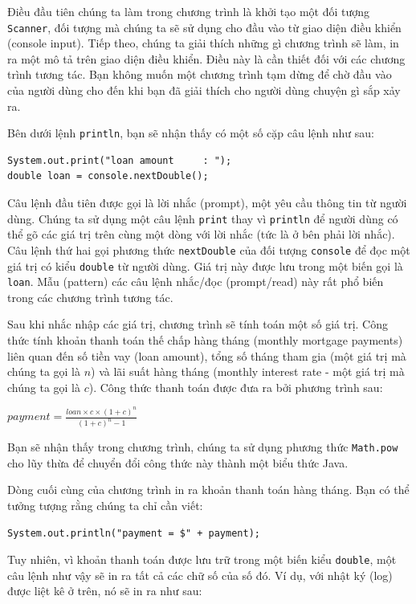 Điều đầu tiên chúng ta làm trong chương trình là khởi tạo một đối tượng
\texttt{Scanner}, đối tượng mà chúng ta sẽ sử dụng cho đầu vào từ giao
diện điều khiển (console input). Tiếp theo, chúng ta giải thích những gì
chương trình sẽ làm, in ra một mô tả trên giao diện điều khiển. Điều này
là cần thiết đối với các chương trình tương tác. Bạn không muốn một
chương trình tạm dừng để chờ đầu vào của người dùng cho đến khi bạn đã
giải thích cho người dùng chuyện gì sắp xảy ra.

Bên dưới lệnh \texttt{println}, bạn sẽ nhận thấy có một số cặp câu lệnh
như sau:

\begin{verbatim}
System.out.print("loan amount     : ");
double loan = console.nextDouble();
\end{verbatim}

Câu lệnh đầu tiên được gọi là lời nhắc (prompt), một yêu cầu thông tin
từ người dùng. Chúng ta sử dụng một câu lệnh \texttt{print} thay vì
\texttt{println} để người dùng có thể gõ các giá trị trên cùng một dòng
với lời nhắc (tức là ở bên phải lời nhắc). Câu lệnh thứ hai gọi phương
thức \texttt{nextDouble} của đối tượng \texttt{console} để đọc một giá
trị có kiểu \texttt{double} từ người dùng. Giá trị này được lưu trong
một biến gọi là \texttt{loan}. Mẫu (pattern) các câu lệnh nhắc/đọc
(prompt/read) này rất phổ biến trong các chương trình tương tác.

Sau khi nhắc nhập các giá trị, chương trình sẽ tính toán một số giá trị.
Công thức tính khoản thanh toán thế chấp hàng tháng (monthly mortgage
payments) liên quan đến số tiền vay (loan amount), tổng số tháng tham
gia (một giá trị mà chúng ta gọi là \(n\)) và lãi suất hàng tháng
(monthly interest rate - một giá trị mà chúng ta gọi là \(c\)). Công
thức thanh toán được đưa ra bởi phương trình sau:

\(payment = \frac{loan \times c \times (1 + c)^n}{(1 + c)^n - 1}\)

Bạn sẽ nhận thấy trong chương trình, chúng ta sử dụng phương thức
\texttt{Math.pow} cho lũy thừa để chuyển đổi công thức này thành một
biểu thức Java.

Dòng cuối cùng của chương trình in ra khoản thanh toán hàng tháng. Bạn
có thể tưởng tượng rằng chúng ta chỉ cần viết:

\begin{verbatim}
System.out.println("payment = $" + payment);
\end{verbatim}

Tuy nhiên, vì khoản thanh toán được lưu trữ trong một biến kiểu
\texttt{double}, một câu lệnh như vậy sẽ in ra tất cả các chữ số của số
đó. Ví dụ, với nhật ký (log) được liệt kê ở trên, nó sẽ in ra như sau:

